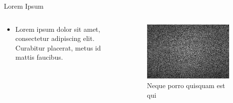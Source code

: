 \documentclass[UKenglish, aspectratio = 169]{beamer}
\begin{document}
\begin{frame}{Lorem Ipsum}
	\begin{columns}
		\begin{column}[T]{0.5\textwidth}
			\vspace*{4ex}
			\begin{itemize}
				\item Lorem ipsum dolor sit amet, consectetur adipiscing elit. Curabitur placerat, metus id mattis faucibus.
			\end{itemize}
		\end{column}
		\begin{column}{0.5\textwidth}
			\begin{figure}
				\centering
				\includegraphics{figs/stock photo.jpg}
				\caption{\tiny{Neque porro quisquam est qui }}
			\end{figure}
		\end{column}
	\end{columns}
\end{frame}
\end{document}

